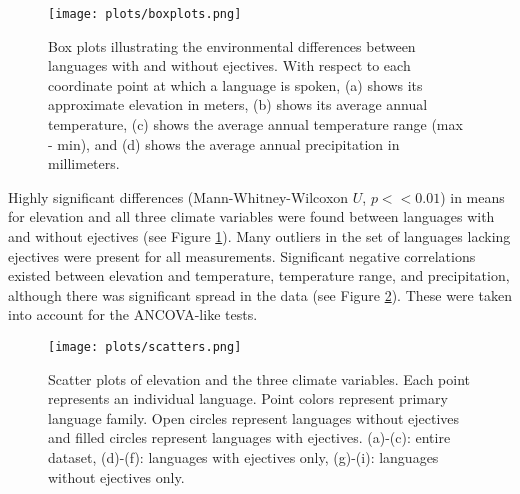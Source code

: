 \documentclass{article}
\begin{document}
\begin{figure}
	\texttt{[image: plots/boxplots.png]}
	\caption{Box plots illustrating the environmental differences between languages with and without ejectives. With respect to each coordinate point at which a language is spoken, (a) shows its approximate elevation in meters, (b) shows its average annual temperature, (c) shows the average annual temperature range (max - min), and (d) shows the average annual precipitation in millimeters.}
	\label{fig:boxplots}
\end{figure}

Highly significant differences (Mann-Whitney-Wilcoxon $U$, $p << 0.01$) in means for elevation and all three climate variables were found between languages with and without ejectives (see Figure \ref{fig:boxplots}). Many outliers in the set of languages lacking ejectives were present for all measurements. Significant negative correlations existed between elevation and temperature, temperature range, and precipitation, although there was significant spread in the data (see Figure \ref{fig:scatterplots}). These were taken into account for the ANCOVA-like tests.

\begin{figure}
	\texttt{[image: plots/scatters.png]}
	\caption{Scatter plots of elevation and the three climate variables. Each point represents an individual language. Point colors represent primary language family. Open circles represent languages without ejectives and filled circles represent languages with ejectives. (a)-(c): entire dataset, (d)-(f): languages with ejectives only, (g)-(i): languages without ejectives only.}
	\label{fig:scatterplots}
\end{figure}
\end{document}
